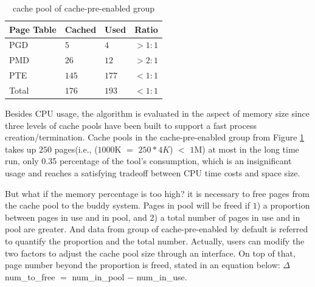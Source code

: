 
\begin{table}[!ht]
\footnotesize
\begin{center}
\begin{tabular}{|l|l|l|l}
\hline
{\textbf{Page Table}} & {\textbf{Cached}} & {\textbf{Used}} & {\textbf{Ratio}} \\ \hline
PGD & $5$  & $4$   & $>1:1$ \\ \hline
PMD & $26$ & $12$   & $>2:1$ \\ \hline
PTE & $145$ & $177$ & $<1:1$ \\ \hline
Total & $176$ & $193$ & $<1:1$ \\ \hline
\end{tabular}
\end{center}
\caption{cache pool of cache-pre-enabled group}
\label{tab:prePGpool}
\end{table}

Besides CPU usage, the algorithm is evaluated in the aspect of memory size since three levels of cache pools have been built to support a fast process creation/termination. Cache pools in the cache-pre-enabled group from Figure \ref{tab:prePGpool} takes up $250$ pages(i.e., ($1000$K $=$ $250 * 4K$) $<$ $1$M) at most in the long time run, only 0.35 percentage of the tool's consumption, which is an insignificant usage and reaches a satisfying tradeoff between CPU time costs and space size.

But what if the memory percentage is too high? it is necessary to free pages from the cache pool to the buddy system. Pages in pool will be freed if $1$) a proportion between pages in use and in pool, and $2$) a total number of pages in use and in pool are greater. And data from group of cache-pre-enabled by default is referred to quantify the proportion and the total number. Actually, users can modify the two factors to adjust the cache pool size through an interface. On top of that, page number beyond the proportion is freed, stated in an equation below: $\Delta$num\_to\_free $=$ num\_in\_pool $-$ num\_in\_use.

